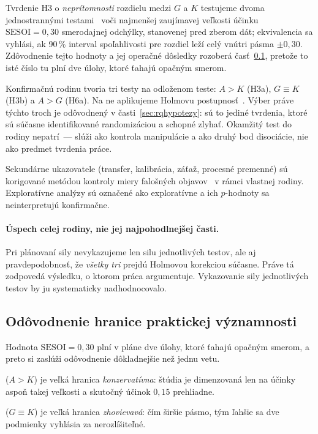 Tvrdenie H3 o \emph{neprítomnosti} rozdielu medzi $G$ a $K$ testujeme dvoma jednostrannými testami~\cite{lakens2017tost} voči najmenšej zaujímavej veľkosti účinku $\mathrm{SESOI}=0{,}30$ smerodajnej odchýlky, stanovenej pred zberom dát; ekvivalencia sa vyhlási, ak 90\,\% interval spoľahlivosti pre rozdiel leží celý vnútri pásma $\pm0{,}30$. Zdôvodnenie tejto hodnoty a jej operačné dôsledky rozoberá časť~\ref{sec:sesoi}, pretože to isté číslo tu plní dve úlohy, ktoré ťahajú opačným smerom.

\label{subsec:multiplicita}
Konfirmačnú rodinu tvoria tri testy na odloženom teste: $A>K$ (H3a), $G\equiv K$ (H3b) a $A>G$ (H6a). Na ne aplikujeme Holmovu postupnosť~\cite{holm1979sequential}. Výber práve týchto troch je odôvodnený v časti~\ref{sec:rqhypotezy}: sú to jediné tvrdenia, ktoré sú súčasne identifikované randomizáciou a schopné zlyhať. Okamžitý test do rodiny nepatrí~--- slúži ako kontrola manipulácie a ako druhý bod disociácie, nie ako predmet tvrdenia práce.

Sekundárne ukazovatele (transfer, kalibrácia, záťaž, procesné premenné) sú korigované metódou kontroly miery falošných objavov~\cite{benjamini1995fdr} v rámci vlastnej rodiny. Exploratívne analýzy sú označené ako exploratívne a ich $p$-hodnoty sa neinterpretujú konfirmačne.

\paragraph{Úspech celej rodiny, nie jej najpohodlnejšej časti.} Pri plánovaní sily nevykazujeme len silu jednotlivých testov, ale aj pravdepodobnosť, že \emph{všetky tri} prejdú Holmovou korekciou súčasne. Práve tá zodpovedá výsledku, o ktorom práca argumentuje. Vykazovanie sily jednotlivých testov by ju systematicky nadhodnocovalo.

\subsection{Odôvodnenie hranice praktickej významnosti}
\label{sec:sesoi}

Hodnota $\mathrm{SESOI}=0{,}30$ plní v pláne dve úlohy, ktoré ťahajú opačným smerom, a preto si zaslúži odôvodnenie dôkladnejšie než jednu vetu.

\begin{description}[leftmargin=0.6cm, nosep]
    \item[\textbf{Pri teste nadradenosti}] ($A>K$) je veľká hranica \emph{konzervatívna}: štúdia je dimenzovaná len na účinky aspoň takej veľkosti a skutočný účinok $0{,}15$ prehliadne.
    \item[\textbf{Pri teste ekvivalencie}] ($G\equiv K$) je veľká hranica \emph{zhovievavá}: čím širšie pásmo, tým ľahšie sa dve podmienky vyhlásia za nerozlíšiteľné.
\end{description}

